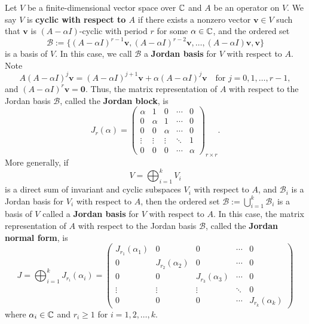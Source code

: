 \begin{definitionenv}
    Let $V$ be a finite-dimensional vector space over $\mathbb{C}$ and $A$ be an operator on $V$. We say $V$ is \textbf{cyclic with respect to $A$} if there exists a nonzero vector $\bm v \in V$ such that $\bm v$ is $(A-\alpha I)$-cyclic with period $r$ for some $\alpha \in \mathbb{C}$, and the ordered set
    $$ \mathcal B := \{ (A-\alpha I)^{r-1} \bm v, (A-\alpha I)^{r-2} \bm v, \ldots, (A-\alpha I) \bm v, \bm v \} $$
    is a basis of $V$. In this case, we call $\mathcal B$ a \textbf{Jordan basis} for $V$ with respect to $A$. Note
    $$ A(A-\alpha I)^j \bm v = (A-\alpha I)^{j+1} \bm v + \alpha (A-\alpha I)^j \bm v \quad \text{for } j=0,1,\ldots,r-1, $$
    and $(A-\alpha I)^r \bm v = \bm 0$. Thus, the matrix representation of $A$ with respect to the Jordan basis $\mathcal B$, called the \textbf{Jordan block}, is
    $$ J_r(\alpha) =
    \begin{pmatrix}
        \alpha & 1 & 0 & \cdots & 0 \\
        0 & \alpha & 1 & \cdots & 0 \\
        0 & 0 & \alpha & \cdots & 0 \\
        \vdots & \vdots & \vdots & \ddots & 1 \\
        0 & 0 & 0 & \cdots & \alpha
    \end{pmatrix}_{r\times r}.
    $$
    More generally, if
    $$ V = \bigoplus_{i=1}^k V_i $$
    is a direct sum of invariant and cyclic subspaces $V_i$ with respect to $A$, and $\mathcal B_i$ is a Jordan basis for $V_i$ with respect to $A$, then the ordered set
    $\displaystyle \mathcal B := \bigcup_{i=1}^k \mathcal B_i $
    is a basis of $V$ called a \textbf{Jordan basis} for $V$ with respect to $A$. In this case, the matrix representation of $A$ with respect to the Jordan basis $\mathcal B$, called the \textbf{Jordan normal form}, is
    $$ J = \bigoplus_{i=1}^k J_{r_i}(\alpha_i) = \begin{pmatrix}
        J_{r_1}(\alpha_1) & 0 & 0 & \cdots & 0 \\
        0 & J_{r_2}(\alpha_2) & 0 & \cdots & 0 \\
        0 & 0 & J_{r_3}(\alpha_3) & \cdots & 0 \\
        \vdots & \vdots & \vdots & \ddots & 0 \\
        0 & 0 & 0 & \cdots & J_{r_k}(\alpha_k)
    \end{pmatrix}
    $$
    where $\alpha_i \in \mathbb{C}$ and $r_i \ge 1$ for $i=1,2,\ldots,k$.
\end{definitionenv}
